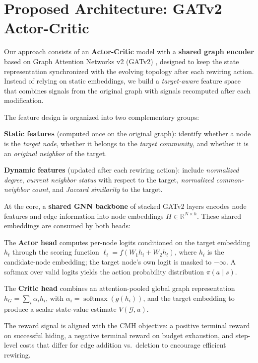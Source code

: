 \documentclass[a4paper]{article}
\begin{document}
\section{Proposed Architecture: GATv2 Actor-Critic}
\label{sec:gatv2-v1}

Our approach consists of an \textbf{Actor-Critic} model with a \textbf{shared
graph encoder} based on Graph Attention Networks v2 (GATv2)
\parencite{brody2022attentivegraphattentionnetworks}, designed to keep the state
representation synchronized with the evolving topology after each rewiring
action. Instead of relying on static embeddings, we build a
\textit{target-aware} feature space that combines signals from the original
graph with signals recomputed after each modification.

The feature design is organized into two complementary groups:

\textbf{Static features} (computed once on the original graph): identify
whether a node is the \textit{target node}, whether it belongs to the
\textit{target community}, and whether it is an \textit{original neighbor} of
the target.

\textbf{Dynamic features} (updated after each rewiring action): include
\textit{normalized degree}, \textit{current neighbor status} with respect to
the target, \textit{normalized common-neighbor count}, and \textit{Jaccard
similarity} to the target.

At the core, a \textbf{shared GNN backbone} of stacked GATv2 layers encodes
node features and edge information into node embeddings
$H \in \mathbb{R}^{N \times h}$. These shared embeddings are consumed by both
heads:

The \textbf{Actor head} computes per-node logits conditioned on the target
embedding $h_t$ through the scoring function $\ell_i = f(W_1 h_i + W_2 h_t)$,
where $h_i$ is the candidate-node embedding; the target node's own logit is
masked to $-\infty$. A softmax over valid logits yields the action probability
distribution $\pi(a \mid s)$.

The \textbf{Critic head} combines an attention-pooled global graph
representation $h_G = \sum_i \alpha_i h_i$, with $\alpha_i =
\operatorname{softmax}(g(h_i))$, and the target embedding to produce a scalar
state-value estimate $V(\mathcal{G}, u)$.

The reward signal is aligned with the CMH objective: a positive terminal reward
on successful hiding, a negative terminal reward on budget exhaustion, and
step-level costs that differ for edge addition vs.\ deletion to encourage
efficient rewiring.
\end{document}
